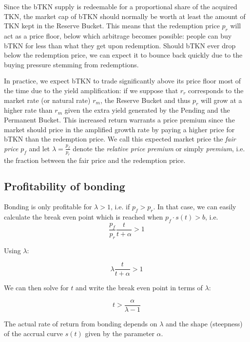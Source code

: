 \documentclass{article}
\begin{document}
Since the bTKN supply is redeemable for a proportional share of the acquired TKN, the market cap of bTKN should normally be worth at least the amount of TKN kept in the Reserve Bucket. This means that the redemption price $p_r$ will act as a price floor, below which arbitrage becomes possible: people can buy bTKN for less than what they get upon redemption. Should bTKN ever drop below the redemption price, we can expect it to bounce back quickly due to the buying pressure stemming from redemptions.

In practice, we expect bTKN to trade significantly above its price floor most of the time due to the yield amplification: if we suppose that $r_r$ corresponds to the market rate (or natural rate) $r_m$, the Reserve Bucket and thus $p_r$ will grow at a higher rate than $r_m$ given the extra yield generated by the Pending and the Permanent Bucket. This increased return warrants a price premium since the market should price in the amplified growth rate by paying a higher price for bTKN than the redemption price. We call this expected market price the \textit{fair price} $p_f$ and let $\lambda = \frac{p_f}{p_r}$ denote the \textit{relative price premium} or simply \textit{premium}, i.e. the fraction between the fair price and the redemption price.

\subsection{Profitability of bonding}
Bonding is only profitable for $\lambda>1$, i.e. if $p_f>p_r$. In that case, we can easily calculate the break even point which is reached when $p_f \cdot s(t)>b$, i.e.
\begin{equation}
  \label{eq:break_even_0}
\frac{p_f}{p_r}\frac{t}{t+\alpha} > 1
\end{equation}

Using $\lambda$:

\begin{equation}
  \label{eq:break_even_0}
\lambda\frac{t}{t+\alpha} > 1
\end{equation}

We can then solve for $t$ and write the break even point in terms of $\lambda$:

\begin{equation}
  \label{eq:break_even_2}
t > \frac{\alpha}{\lambda-1}
\end{equation}

The actual rate of return from bonding depends on $\lambda$ and the shape (steepness) of the accrual curve $s(t)$ given by the parameter $\alpha$.
\end{document}
